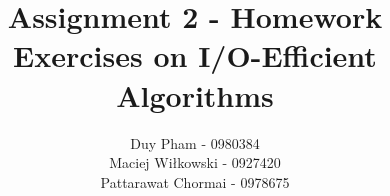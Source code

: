 \documentclass{article}
\begin{document}
\title{Assignment 2 - Homework Exercises on I/O-Efficient Algorithms}
\author{
	Duy Pham - 0980384 \\
	Maciej Wiłkowski - 0927420 \\
	Pattarawat Chormai - 0978675 \\
}
\maketitle











\end{document}
